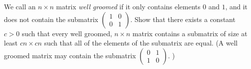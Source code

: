 We call an $n\times n$ matrix \textit{well groomed} if it only contains elements $0$ and $1$, and it does not contain the submatrix $\begin{pmatrix}
1& 0\\
 0 & 1
\end{pmatrix}.$ Show that there exists a constant $c>0$ such that every well groomed, $n\times n$ matrix contains a submatrix of size at least $cn\times cn$ such that all of the elements of  the submatrix are equal. (A well groomed matrix may contain the submatrix $\begin{pmatrix}
0& 1\\
1 & 0
\end{pmatrix}.$ )